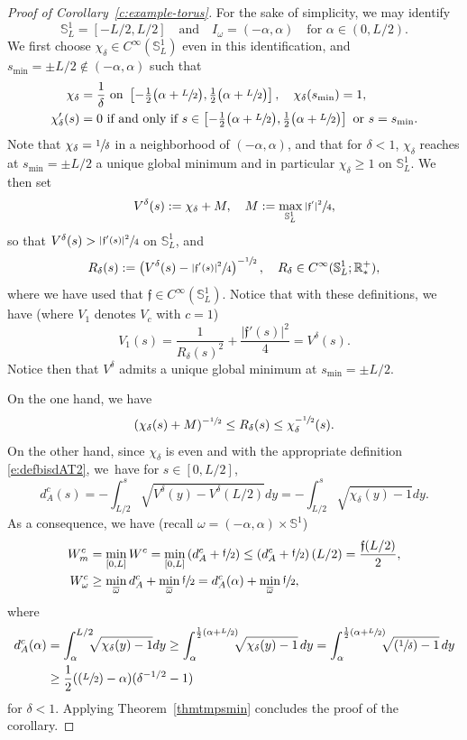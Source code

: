 \documentclass[JEP,XML,SOM,Unicode]{cedram}
\newcommand{\Psfrac}[2]{(\sfrac{#1}{#2})}
\theoremstyle{definition}
\newcommand{\mb}[1]{\ensuremath{\mathbb{#1}}}
\newcommand{\R}{{\mb{R}}}
\newcommand{\bS}{\ensuremath{\mathbb S}}
\newcommand{\f}{\ensuremath{\mathfrak{f}}}
\newcommand\bnp{\begin{proof}}
\newcommand\enp{\end{proof}}
\newcommand{\ce}{c}
\begin{document}
\bnp[Proof of Corollary~\ref{c:example-torus}]
For the sake of simplicity, we may identify
\[
\bS^1_L = [-L/2,L/2]\quad\text{and}\quad I_\omega= (-\alpha,\alpha)\quad\text{for }\alpha \in (0,L/2).
\]
We first choose $\chi_\delta \in C^\infty(\bS^1_L)$ even in this identification, and $s_{\min} = \pm L/2 \notin (-\alpha,\alpha)$ such that
\begin{align*}
\chi_\delta &=\frac{1}{\delta} \text{ on } \left[-\tfrac12\big(\alpha+\sfrac{L}{2}\big),\tfrac12\big(\alpha+\sfrac{L}{2}\big) \right], \quad \chi_\delta(s_{\min}) = 1, \\
\chi_\delta'(s) &= 0 \text{ if and only if } s\in \left[-\tfrac12\big(\alpha+\sfrac{L}{2}\big),\tfrac12\big(\alpha+\sfrac{L}{2}\big) \right] \text{ or } s= s_{\min}.
\end{align*}
Note that $\chi_\delta=\sfrac{1}{\delta}$ in a neighborhood of $(-\alpha, \alpha)$, and that for $\delta<1$, $\chi_\delta$ reaches at $s_{\min}=\pm L/2$ a unique global minimum and in particular $\chi_\delta \geq 1$ on $\bS^1_L$.
We then set
\[
V^\delta(s) := \chi_\delta +M, \quad M:= \max_{\bS^1_L}\sfrac{|\f'|^2}{4},
\]
so that $V^\delta(s)>\sfrac{|\f'(s)|^2}{4}$ on $\bS^1_L$, and
\[
R_\delta(s) := \left(V^\delta(s) - \sfrac{|\f'(s)|^2}{4} \right)^{-\sfrac12}, \quad R_\delta \in C^\infty(\bS^1_L; \R^+_*),
\]
where we have used that $\f\in C^{\infty}(\bS^1_L)$.
Notice that with these definitions, we have (where $V_1$ denotes $V_\ce$ with $\ce=1$)
\[
V_1 (s) = \frac{1}{R_\delta(s)^2} + \frac{|\f'(s)|^2}{4} = V^\delta(s).
\]
Notice then that $V^\delta$ admits a unique global minimum at $s_{\min} =\pm L/2$.

On the one hand, we have
\[
(\chi_\delta(s) +M)^{-\sfrac12}\leq R_\delta(s) \leq \chi_\delta^{-\sfrac12}(s).
\]
On the other hand, since $\chi_\delta$ is even and with the appropriate definition \eqref{e:defbisdAT2}, we~have for $s\in [0, L/2]$,
\[
d_A^{\ce}(s) = - \int_{L/2}^s \sqrt{ V^\delta(y)- V^\delta(L/2)} dy
= - \int_{L/2}^s \sqrt{\chi_\delta(y) - 1} dy.
\]
As a consequence, we have (recall $\omega = (-\alpha,\alpha) \times \bS^1$)
\begin{align*}
W^{\ce}_m & = \min_{[0,L]}W^{\ce} = \min_{[0,L]} \left( d_A^{\ce} +\sfrac{\f}{2} \right) \leq \left( d_A^{\ce} +\sfrac{\f}{2} \right) (L/2) = \frac{\f(L/2)}{2}, \\
W^{\ce}_{\omega} & \geq \min_{\overline{\omega}} d_{A}^{\ce} +\min_{\overline{\omega}} \sfrac{\f}{2} = d_{A}^{\ce}(\alpha) +\min_{\overline{\omega}} \sfrac{\f}{2},
\end{align*}
where
\begin{align*}
d_A^{\ce} (\alpha) &=\int_\alpha^{L/2}\hspace*{-2mm} \sqrt{\chi_\delta(y) - 1} dy \geq \int_\alpha^{\frac12(\alpha+\sfrac{L}{2})}\hspace*{-2mm} \sqrt{\chi_\delta(y) - 1}\, dy
=\int_\alpha^{\frac12(\alpha+\sfrac{L}{2})}\hspace*{-2mm} \sqrt{\Psfrac{1}{\delta} - 1}\, dy \\
& \geq \frac12(\Psfrac{L}{2}-\alpha) (\delta^{-1/2}-1)
\end{align*}
for $\delta<1$. Applying Theorem~\ref{thmtmpsmin} concludes the proof of the corollary.
\enp
\end{document}
